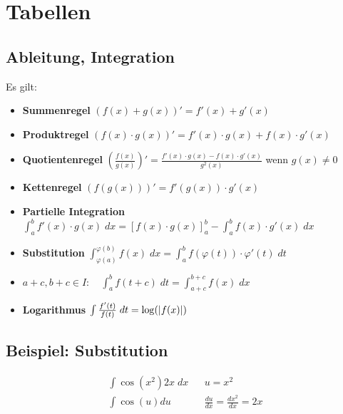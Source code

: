 \section{Tabellen}
\subsection{Ableitung, Integration}
Es gilt:
\begin{itemize}
  \item \textbf{Summenregel} $ (f (x) + g (x))' = f' (x) + g' (x)$
  \item \textbf{Produktregel} $ (f (x) \cdot g (x))' = f' (x) \cdot g (x) + f (x) \cdot g' (x)$
  \item \textbf{Quotientenregel} $\left( \frac{f (x)}{g (x)} \right)' = \frac{f' (x) \cdot g (x) - f (x) \cdot g' (x)}{g^2 (x)}$ wenn $g (x) \neq 0$
  \item \textbf{Kettenregel} $ (f (g (x)))' = f' (g (x)) \cdot g' (x)$
  \item \textbf{Partielle Integration} $\int_a^b f' (x) \cdot g (x) \; dx = [f (x) \cdot g (x)]_a^b - \int_a^b f (x) \cdot g' (x) \; dx$
  \item \textbf{Substitution} $\int_{\varphi (a)}^{\varphi (b)} f (x) \; dx = \int_a^b f (\varphi (t)) \cdot \varphi' (t) \; dt$
  \item $a+c, b+c \in I: \quad \int_a^b f (t + c) \; dt = \int_{a+c}^{b+c} f (x) \; dx$
  \item \textbf{Logarithmus} $\int \frac{f' (t)}{f (t)} \; dt = \log (\abs{f (x)})$
\end{itemize}
\BoxStart{}
\subsection{Beispiel: Substitution}
\begin{align*}
  \int \cos (x^2) 2x \; dx &  & u = x^2                              \\
  \int \cos (u) du         &  & \frac{du}{dx} = \frac{dx^2}{dx} = 2x
\end{align*}
\BoxEnd{}
